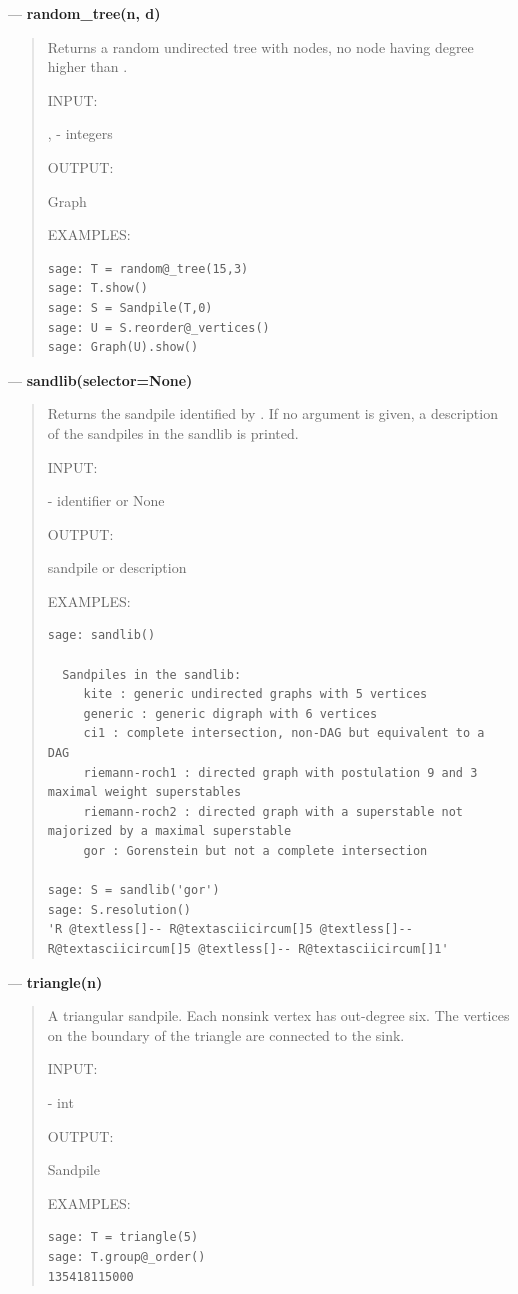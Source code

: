 \documentclass[letterpaper,10pt,english]{manual}
\begin{document}
---
\hypertarget{random-tree-n-d}{}
\textbf{random\_tree(n, d)}
\begin{quote}

Returns a random undirected tree with  nodes, no node having
degree higher than .

INPUT:

,  - integers

OUTPUT:

Graph

EXAMPLES:

\begin{Verbatim}[commandchars=@\[\]]
sage: T = random@_tree(15,3)
sage: T.show()
sage: S = Sandpile(T,0)
sage: U = S.reorder@_vertices()
sage: Graph(U).show()
\end{Verbatim}
\end{quote}

---
\hypertarget{sandlib-selector}{}
\textbf{sandlib(selector=None)}
\begin{quote}

Returns the sandpile identified by .  If no argument is
given, a description of the sandpiles in the sandlib is printed.

INPUT:

 - identifier or None

OUTPUT:

sandpile or description

EXAMPLES:

\begin{Verbatim}[commandchars=@\[\]]
sage: sandlib()

  Sandpiles in the sandlib:
     kite : generic undirected graphs with 5 vertices
     generic : generic digraph with 6 vertices
     ci1 : complete intersection, non-DAG but equivalent to a DAG
     riemann-roch1 : directed graph with postulation 9 and 3 maximal weight superstables
     riemann-roch2 : directed graph with a superstable not majorized by a maximal superstable
     gor : Gorenstein but not a complete intersection

sage: S = sandlib('gor')
sage: S.resolution()
'R @textless[]-- R@textasciicircum[]5 @textless[]-- R@textasciicircum[]5 @textless[]-- R@textasciicircum[]1'
\end{Verbatim}
\end{quote}

---
\hypertarget{triangle-n}{}
\textbf{triangle(n)}
\begin{quote}

A triangular sandpile.  Each nonsink vertex has out-degree six.  The
vertices on the boundary of the triangle are connected to the sink.

INPUT:

 - int

OUTPUT:

Sandpile

EXAMPLES:

\begin{Verbatim}[commandchars=@\[\]]
sage: T = triangle(5)
sage: T.group@_order()
135418115000
\end{Verbatim}
\end{quote}
\end{document}
